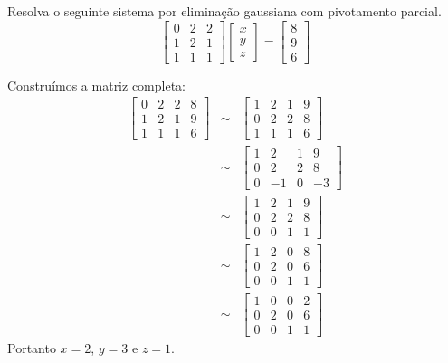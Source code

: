 \begin{ex}
Resolva o seguinte sistema por eliminação gaussiana com pivotamento parcial.
\begin{equation*}
\left[
\begin{array}{ccc}
0 &2& 2\\
1 &2& 1\\
1 & 1 &1
\end{array}
\right]
\left[
\begin{array}{c}
x\\
y\\
z
\end{array}
\right]=
\left[
\begin{array}{c}
8\\
9\\
6
\end{array}
\right]  
\end{equation*}
\end{ex}
\begin{sol}
Construímos a matriz completa:
\begin{eqnarray*}\left[
\begin{array}{ccc|c}
0 &2& 2&8\\
1 &2& 1&9\\
1 & 1 &1&6
\end{array}
\right] &\sim&
\left[
\begin{array}{ccc|c}
1 &2& 1&9\\
0 &2& 2&8\\
1 & 1 &1&6
\end{array}
\right] \\ 
&\sim&
\left[
\begin{array}{ccc|c}
1 &2& 1&9\\
0 &2& 2&8\\
0 & -1 &0&-3
\end{array}
\right]\\
&\sim&
\left[
\begin{array}{ccc|c}
1 &2& 1&9\\
0 &2& 2&8\\
0 & 0 &1&1
\end{array}
\right]\\
&\sim&
\left[
\begin{array}{ccc|c}
1 &2& 0&8\\
0 &2& 0&6\\
0 & 0 &1&1
\end{array}
\right]\\
&\sim&
\left[
\begin{array}{ccc|c}
1 &0& 0&2\\
0 &2& 0&6\\
0 & 0 &1&1
\end{array}
\right]
\end{eqnarray*}
Portanto $x=2$, $y=3$ e $z=1$.
\end{sol}

